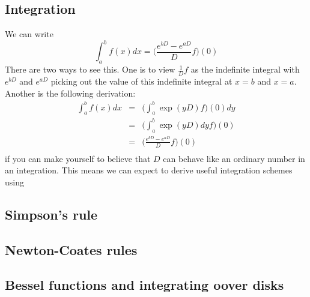 \documentclass[a4paper]{article}
\theoremstyle{definition}
\begin{document}
\subsection{Integration}
We can write
\[
\int_a^b f(x)dx = \Big(\frac{e^{bD}-e^{aD}}{D}f\Big)(0)
\]
There are two ways to see this.
One is to view $\frac{1}{D}f$ as the indefinite integral with $e^{bD}$ and $e^{aD}$ picking out the value of this indefinite integral at $x=b$ and $x=a$.
Another is the following derivation:
\begin{eqnarray*}
\int_a^b f(x)dx & = & \Big(\int_a^b\exp(yD)f\Big)(0) dy \\
& = & \Big(\int_a^b\exp(yD)dy f\Big)(0) \\
& = & \Big(\frac{e^{bD}-e^{aD}}{D}f\Big)(0) \\
\end{eqnarray*}
if you can make yourself to believe that $D$ can behave like an ordinary number in an integration.
This means we can expect to derive useful integration schemes using

\subsection{Simpson's rule}

\subsection{Newton-Coates rules}

\subsection{Bessel functions and integrating oover disks}



\end{document}
